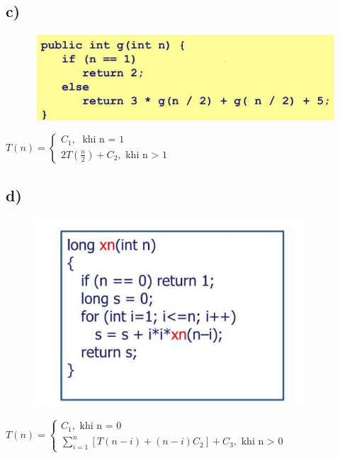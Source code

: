 \documentclass[10pt,a4paper]{article}
\begin{document}
\subsection*{c)}
\begin{figure}[H]
    \centering
    \includegraphics[scale=0.6]{images/1c.png}
    \label{fig:my_label}
\end{figure}
$
T(n) = 
    \begin{cases}
        C_1, \text{ khi n $=$ 1} \\
        2T(\frac{n}{2}) + C_2, \text{ khi n > 1}
    \end{cases}
$
\subsection*{d)}
\begin{figure}[H]
    \centering
    \includegraphics[scale=1]{images/1d.png}
    \label{fig:my_label}
\end{figure}
$
T(n) = 
    \begin{cases}
        C_1, \text{ khi n = 0} \\
        \sum_{i=1}^{n}{[T(n-i) + (n-i)C_2]} + C_3, \text{ khi n > 0}
    \end{cases}
$
\end{document}
